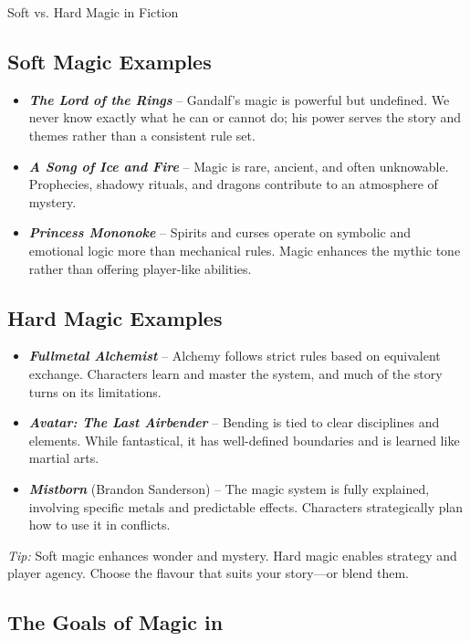 \begin{WyrdSidebar}[float=!t]{Soft vs. Hard Magic in Fiction}
    \subsection*{Soft Magic Examples}
    \begin{itemize}
        \item \textbf{\emph{The Lord of the Rings}} – Gandalf’s magic is powerful but undefined. We never know exactly what he can or cannot do; his power serves the story and themes rather than a consistent rule set.
        \item \textbf{\emph{A Song of Ice and Fire}} – Magic is rare, ancient, and often unknowable. Prophecies, shadowy rituals, and dragons contribute to an atmosphere of mystery.
        \item \textbf{\emph{Princess Mononoke}} – Spirits and curses operate on symbolic and emotional logic more than mechanical rules. Magic enhances the mythic tone rather than offering player-like abilities.
    \end{itemize}
    
    \subsection*{Hard Magic Examples}
    \begin{itemize}
        \item \textbf{\emph{Fullmetal Alchemist}} – Alchemy follows strict rules based on equivalent exchange. Characters learn and master the system, and much of the story turns on its limitations.
        \item \textbf{\emph{Avatar: The Last Airbender}} – Bending is tied to clear disciplines and elements. While fantastical, it has well-defined boundaries and is learned like martial arts.
        \item \textbf{\emph{Mistborn}} (Brandon Sanderson) – The magic system is fully explained, involving specific metals and predictable effects. Characters strategically plan how to use it in conflicts.
    \end{itemize}
    
    \noindent
    \textit{Tip:} Soft magic enhances wonder and mystery. Hard magic enables strategy and player agency. Choose the flavour that suits your story—or blend them.
\end{WyrdSidebar}
    

\subsection{The Goals of Magic in \wyrd}

